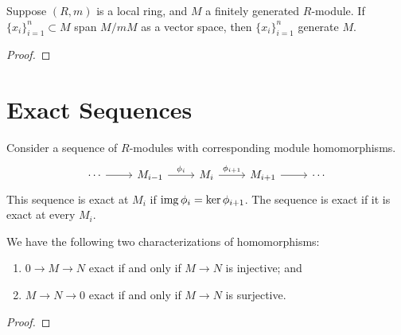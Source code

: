 \begin{theorem}
    Suppose \((R,m)\) is a local ring,
    and \(M\) a finitely generated \(R\)-module.
    If \({\{x_i\}}_{i=1}^n \subset M\) span \(M/mM\) as a vector space,
    then \({\{x_i\}}_{i=1}^n\) generate \(M\).
\end{theorem}
\begin{proof}
    
\end{proof}


\section{Exact Sequences}

\begin{definition}
    Consider a sequence of \(R\)-modules with corresponding module homomorphisms.
    \begin{equation*}
        \begin{tikzcd}
            \cdots \arrow{r} & M_{i-1} \arrow{r}{\phi_i} &
            M_i \arrow{r}{\phi_{i+1}} & M_{i+1} \arrow{r} & \cdots
        \end{tikzcd}
    \end{equation*}
    This sequence is exact at \(M_i\) if \(\operatorname{img}\phi_i = \ker\phi_{i+1}\).
    The sequence is exact if it is exact at every \(M_i\).
\end{definition}

\begin{proposition}
    We have the following two characterizations of homomorphisms:
    \begin{enumerate}[label={(\alph*)}, itemsep=0mm]
        \item \(0 \to M \to N\) exact if and only if \(M \to N\) is injective; and
        \item \(M \to N \to 0\) exact if and only if \(M \to N\) is surjective.
    \end{enumerate}
\end{proposition}
\begin{proof}
    
\end{proof}

